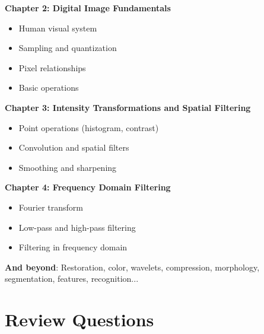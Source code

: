 \documentclass[12pt,a4paper]{article}
\begin{document}
\begin{conceptbox}
\textbf{Chapter 2: Digital Image Fundamentals}
\begin{itemize}
    \item Human visual system
    \item Sampling and quantization
    \item Pixel relationships
    \item Basic operations
\end{itemize}

\textbf{Chapter 3: Intensity Transformations and Spatial Filtering}
\begin{itemize}
    \item Point operations (histogram, contrast)
    \item Convolution and spatial filters
    \item Smoothing and sharpening
\end{itemize}

\textbf{Chapter 4: Frequency Domain Filtering}
\begin{itemize}
    \item Fourier transform
    \item Low-pass and high-pass filtering
    \item Filtering in frequency domain
\end{itemize}

\textbf{And beyond}: Restoration, color, wavelets, compression, morphology, segmentation, features, recognition...
\end{conceptbox}

\section{Review Questions}
\end{document}
